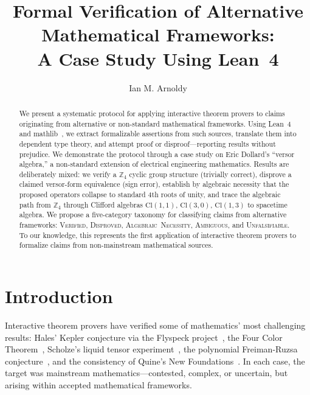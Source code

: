\documentclass[runningheads]{llncs}
\begin{document}
\title{Formal Verification of Alternative Mathematical Frameworks:\\
A Case Study Using Lean~4}

\author{Ian M. Arnoldy}

\maketitle

\begin{abstract}
We present a systematic protocol for applying interactive theorem provers to
claims originating from alternative or non-standard mathematical frameworks.
Using Lean~4~\cite{demoura2021lean4} and mathlib~\cite{mathlib}, we extract formalizable assertions from such sources,
translate them into dependent type theory, and attempt proof or disproof---reporting
results without prejudice. We demonstrate the protocol through a case study on
Eric Dollard's ``versor algebra,'' a non-standard extension of electrical
engineering mathematics. Results are deliberately mixed: we verify a $\mathbb{Z}_4$
cyclic group structure (trivially correct), disprove a claimed versor-form
equivalence (sign error), establish by algebraic necessity that the proposed
operators collapse to standard 4th roots of unity, and trace the algebraic path
from $\mathbb{Z}_4$ through Clifford algebras $\mathrm{Cl}(1,1)$,
$\mathrm{Cl}(3,0)$, $\mathrm{Cl}(1,3)$ to spacetime algebra. We propose a
five-category taxonomy for classifying claims from alternative frameworks:
\textsc{Verified}, \textsc{Disproved}, \textsc{Algebraic~Necessity},
\textsc{Ambiguous}, and \textsc{Unfalsifiable}. To our knowledge, this represents
the first application of interactive theorem provers to formalize claims from
non-mainstream mathematical sources.
\end{abstract}


\section{Introduction}
\label{sec:intro}

Interactive theorem provers have verified some of mathematics' most challenging
results: Hales' Kepler conjecture via the Flyspeck project~\cite{hales2017formal},
the Four Color Theorem~\cite{gonthier2008four}, Scholze's liquid tensor
experiment~\cite{commelin2022liquid}, the polynomial Freiman-Ruzsa
conjecture~\cite{tao2023pfr}, and the consistency of Quine's New
Foundations~\cite{wilshaw2024nf}. In each case, the target was mainstream
mathematics---contested, complex, or uncertain, but arising within accepted
mathematical frameworks.
\end{document}

